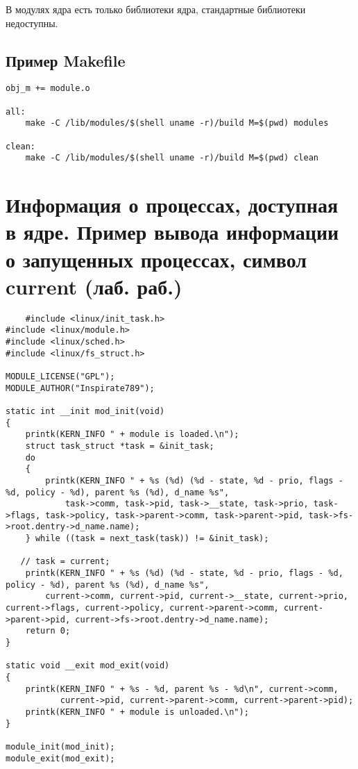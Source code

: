 В модулях ядра есть только библиотеки ядра, стандартные библиотеки недоступны. 

\subsection{Пример Makefile}

\begin{lstlisting}
obj_m += module.o

all:
    make -C /lib/modules/$(shell uname -r)/build M=$(pwd) modules
    
clean:
    make -C /lib/modules/$(shell uname -r)/build M=$(pwd) clean
\end{lstlisting}

\section{Информация о процессах, доступная в ядре. Пример вывода информации о запущенных процессах, символ current (лаб. раб.)}

\begin{lstlisting}
    #include <linux/init_task.h>
#include <linux/module.h>
#include <linux/sched.h>
#include <linux/fs_struct.h>

MODULE_LICENSE("GPL");
MODULE_AUTHOR("Inspirate789");

static int __init mod_init(void)
{
    printk(KERN_INFO " + module is loaded.\n");
    struct task_struct *task = &init_task;
    do
    {
        printk(KERN_INFO " + %s (%d) (%d - state, %d - prio, flags - %d, policy - %d), parent %s (%d), d_name %s",
            task->comm, task->pid, task->__state, task->prio, task->flags, task->policy, task->parent->comm, task->parent->pid, task->fs->root.dentry->d_name.name);
    } while ((task = next_task(task)) != &init_task);

   // task = current;
    printk(KERN_INFO " + %s (%d) (%d - state, %d - prio, flags - %d, policy - %d), parent %s (%d), d_name %s",
        current->comm, current->pid, current->__state, current->prio, current->flags, current->policy, current->parent->comm, current->parent->pid, current->fs->root.dentry->d_name.name);
    return 0;
}

static void __exit mod_exit(void)
{
    printk(KERN_INFO " + %s - %d, parent %s - %d\n", current->comm,
           current->pid, current->parent->comm, current->parent->pid);
    printk(KERN_INFO " + module is unloaded.\n");
}

module_init(mod_init);
module_exit(mod_exit);
\end{lstlisting}

